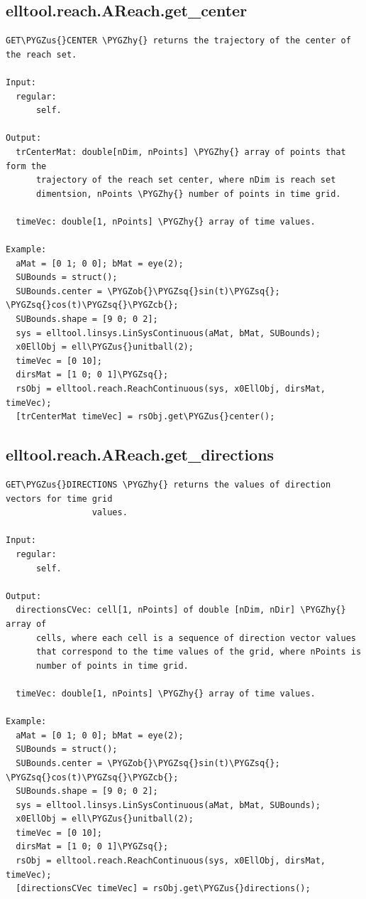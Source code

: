 \documentclass[letterpaper,10pt,english]{sphinxmanual}
\def\PYGZus{\char`\_}
\def\PYGZob{\char`\{}
\def\PYGZcb{\char`\}}
\def\PYGZhy{\char`\-}
\def\PYGZsq{\char`\'}
\begin{document}
\subsection{elltool.reach.AReach.get\_center}
\label{chap_functions:elltool-reach-areach-get-center}
\begin{Verbatim}[commandchars=\\\{\}]
GET\PYGZus{}CENTER \PYGZhy{} returns the trajectory of the center of the reach set.

Input:
  regular:
      self.

Output:
  trCenterMat: double[nDim, nPoints] \PYGZhy{} array of points that form the
      trajectory of the reach set center, where nDim is reach set
      dimentsion, nPoints \PYGZhy{} number of points in time grid.

  timeVec: double[1, nPoints] \PYGZhy{} array of time values.

Example:
  aMat = [0 1; 0 0]; bMat = eye(2);
  SUBounds = struct();
  SUBounds.center = \PYGZob{}\PYGZsq{}sin(t)\PYGZsq{}; \PYGZsq{}cos(t)\PYGZsq{}\PYGZcb{};
  SUBounds.shape = [9 0; 0 2];
  sys = elltool.linsys.LinSysContinuous(aMat, bMat, SUBounds);
  x0EllObj = ell\PYGZus{}unitball(2);
  timeVec = [0 10];
  dirsMat = [1 0; 0 1]\PYGZsq{};
  rsObj = elltool.reach.ReachContinuous(sys, x0EllObj, dirsMat, timeVec);
  [trCenterMat timeVec] = rsObj.get\PYGZus{}center();
\end{Verbatim}


\subsection{elltool.reach.AReach.get\_directions}
\label{chap_functions:elltool-reach-areach-get-directions}
\begin{Verbatim}[commandchars=\\\{\}]
GET\PYGZus{}DIRECTIONS \PYGZhy{} returns the values of direction vectors for time grid
                 values.

Input:
  regular:
      self.

Output:
  directionsCVec: cell[1, nPoints] of double [nDim, nDir] \PYGZhy{} array of
      cells, where each cell is a sequence of direction vector values
      that correspond to the time values of the grid, where nPoints is
      number of points in time grid.

  timeVec: double[1, nPoints] \PYGZhy{} array of time values.

Example:
  aMat = [0 1; 0 0]; bMat = eye(2);
  SUBounds = struct();
  SUBounds.center = \PYGZob{}\PYGZsq{}sin(t)\PYGZsq{}; \PYGZsq{}cos(t)\PYGZsq{}\PYGZcb{};
  SUBounds.shape = [9 0; 0 2];
  sys = elltool.linsys.LinSysContinuous(aMat, bMat, SUBounds);
  x0EllObj = ell\PYGZus{}unitball(2);
  timeVec = [0 10];
  dirsMat = [1 0; 0 1]\PYGZsq{};
  rsObj = elltool.reach.ReachContinuous(sys, x0EllObj, dirsMat, timeVec);
  [directionsCVec timeVec] = rsObj.get\PYGZus{}directions();
\end{Verbatim}
\end{document}
